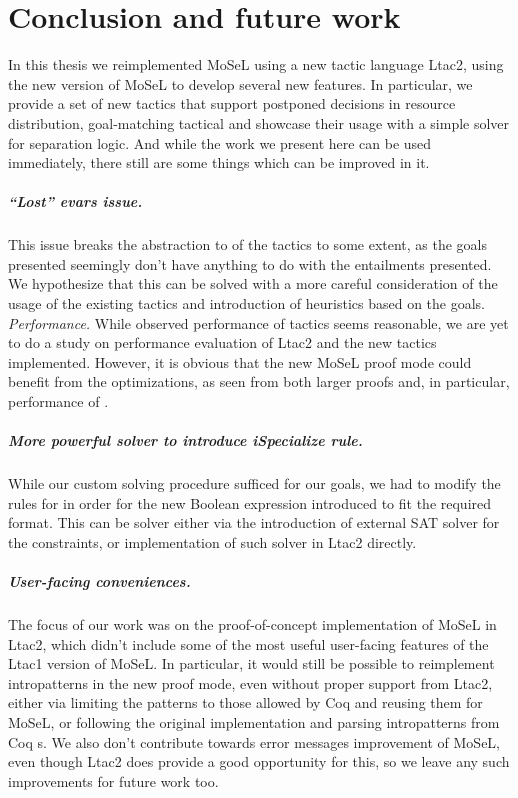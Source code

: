 \chapter{Conclusion and future work}

\vspace{-2em}
In this thesis we reimplemented MoSeL using a new tactic language Ltac2, using the new version of MoSeL to develop several new features.
In particular, we provide a set of new tactics that support postponed decisions in resource distribution, goal-matching tactical and showcase their usage with a simple solver for separation logic.
And while the work we present here can be used immediately, there still are some things which can be improved in it.
\paragraph{``Lost'' evars issue.}
  This issue breaks the abstraction to of the tactics to some extent, as the goals presented seemingly don't have anything to do with the entailments presented.
  We hypothesize that this can be solved with a more careful consideration of the usage of the existing tactics and introduction of heuristics based on the goals.
\emph{Performance.}
  While observed performance of tactics seems reasonable, we are yet to do a study on performance evaluation of Ltac2 and the new tactics implemented.
  However, it is obvious that the new MoSeL proof mode could benefit from the optimizations, as seen from both larger proofs and, in particular, performance of .
\paragraph{More powerful solver to introduce iSpecialize rule.}
  While our custom solving procedure sufficed for our goals, we had to modify the rules for  in order for the new Boolean expression introduced to fit the required format.
  This can be solver either via the introduction of external SAT solver for the constraints, or implementation of such solver in Ltac2 directly.
\paragraph{User-facing conveniences.}
  The focus of our work was on the proof-of-concept implementation of MoSeL in Ltac2, which didn't include some of the most useful user-facing features of the Ltac1 version of MoSeL.
  In particular, it would still be possible to reimplement intropatterns in the new proof mode, even without proper support from Ltac2, either via limiting the patterns to those allowed by Coq and reusing them for MoSeL, or following the original implementation and parsing intropatterns from Coq s.
  We also don't contribute towards error messages improvement of MoSeL, even though Ltac2 does provide a good opportunity for this, so we leave any such improvements for future work too.
